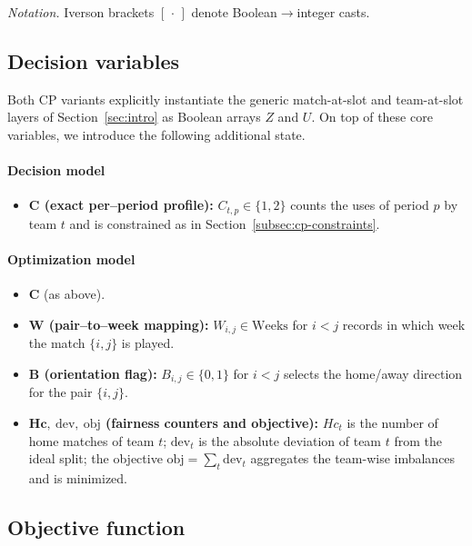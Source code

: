 \documentclass{article}
\begin{document}
\noindent\textit{Notation.} Iverson brackets $[\,\cdot\,]$ denote Boolean$\to$integer casts.

\subsection{Decision variables}
\label{subsec:cp-vars}

Both CP variants explicitly instantiate the generic match-at-slot and
team-at-slot layers of Section~\ref{sec:intro} as Boolean arrays $Z$ and $U$.
On top of these core variables, we introduce the following additional state.

\paragraph{Decision model}
\begin{itemize}\setlength{\itemsep}{2pt}
  \item \textbf{\(\bm{C}\) (exact per--period profile):}
        \(C_{t,p}\in\{1,2\}\) counts the uses of period \(p\) by team \(t\)
        and is constrained as in Section~\ref{subsec:cp-constraints}.
\end{itemize}

\paragraph{Optimization model}
\begin{itemize}\setlength{\itemsep}{2pt}
  \item \(\bm{C}\) (as above).
  \item \textbf{\(\bm{W}\) (pair--to--week mapping):}
        \(W_{i,j}\in\text{Weeks}\) for \(i<j\) records in which week the match
        \(\{i,j\}\) is played.
  \item \textbf{\(\bm{B}\) (orientation flag):}
        \(B_{i,j}\in\{0,1\}\) for \(i<j\) selects the home/away direction for
        the pair \(\{i,j\}\).
  \item \textbf{\(\bm{Hc},\ \bm{\mathrm{dev}},\ \mathrm{obj}\) (fairness
        counters and objective):}
        \(Hc_t\) is the number of home matches of team \(t\);
        \(\mathrm{dev}_t\) is the absolute deviation of team \(t\) from the
        ideal split; the objective
        \(\mathrm{obj}=\sum_{t}\mathrm{dev}_t\) aggregates the team-wise
        imbalances and is minimized.
\end{itemize}


\subsection{Objective function}
\label{subsec:cp-objective}
\end{document}
